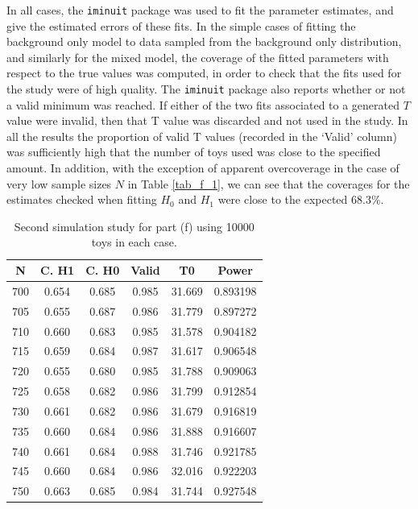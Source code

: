 \documentclass[12pt]{article}
\begin{document}
In all cases, the \texttt{iminuit} package was used to fit the parameter estimates, and give the estimated errors of these fits.
In the simple cases of fitting the background only model to data sampled from the background only distribution, and similarly for the mixed model, the coverage of the fitted parameters with respect to the true values was computed, in order to check that the fits used for the study were of high quality.
The \texttt{iminuit} package also reports whether or not a valid minimum was reached.
If either of the two fits associated to a generated $T$ value were invalid, then that T value was discarded and not used in the study.
In all the results the proportion of valid T values (recorded in the `Valid' column) was sufficiently high that the number of toys used was close to the specified amount.
In addition, with the exception of apparent overcoverage in the case of very low sample sizes $N$ in Table \ref{tab_f_1}, we can see that the coverages for the estimates checked when fitting $H_0$ and $H_1$ were close to the expected 68.3\%.

\begin{table}
    \centering
    \begin{tabular}{| c | c | c | c | c | c |}
        \hline
          N & C. H1   & C. H0    & Valid   & T0       & Power    \\
        \hline
        700 & 0.654   & 0.685    & 0.985   & 31.669   & 0.893198 \\
        \hline
        705 & 0.655   & 0.687    & 0.986   & 31.779   & 0.897272 \\
        \hline
        710 & 0.660   & 0.683    & 0.985   & 31.578   & 0.904182 \\
        \hline
        715 & 0.659   & 0.684    & 0.987   & 31.617   & 0.906548 \\
        \hline
        720 & 0.655   & 0.680    & 0.985   & 31.788   & 0.909063 \\
        \hline
        725 & 0.658   & 0.682    & 0.986   & 31.799   & 0.912854 \\
        \hline
        730 & 0.661   & 0.682    & 0.986   & 31.679   & 0.916819 \\
        \hline
        735 & 0.660   & 0.684    & 0.986   & 31.888   & 0.916607 \\
        \hline
        740 & 0.661   & 0.684    & 0.988   & 31.746   & 0.921785 \\
        \hline
        745 & 0.660   & 0.684    & 0.986   & 32.016   & 0.922203 \\
        \hline
        750 & 0.663   & 0.685    & 0.984   & 31.744   & 0.927548 \\
        \hline
    \end{tabular}
\caption{Second simulation study for part (f) using 10000 toys in each case.}
\label{tab_f_2}
\end{table}
\end{document}
